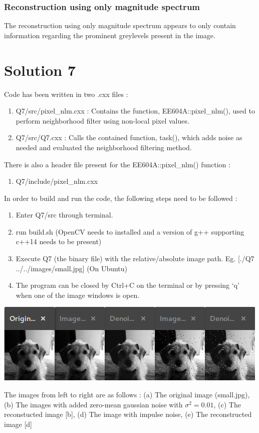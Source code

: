 \documentclass[a4paper,fleqn,11pt]{article}
\theoremstyle{mytheor}
\begin{document}
\subsubsection*{Reconstruction using only magnitude spectrum}
The reconstruction using only magnitude spectrum appears to only contain information regarding the prominent greylevels present in the image.

\section*{Solution 7}
Code has been written in two .cxx files :
\begin{enumerate}
\item Q7/src/pixel\_nlm.cxx : Contains the function, EE604A::pixel\_nlm(), used to perform neighborhood filter using non-local pixel values.
\item Q7/src/Q7.cxx : Calls the contained function, task(), which adds noise as needed and evaluated the neighborhood filtering method.
\end{enumerate}

There is also a header file present for the EE604A::pixel\_nlm() function :
\begin{enumerate}
\item Q7/include/pixel\_nlm.cxx
\end{enumerate}

In order to build and run the code, the following steps need to be followed :
\begin{enumerate}
\item Enter Q7/src through terminal.
\item run build.sh (OpenCV needs to installed and a version of g++ supporting c++14 needs to be present)
\item Execute Q7 (the binary file) with the relative/absolute image path. Eg. [./Q7 ../../images/small.jpg] (On Ubuntu)
\item The program can be closed by Ctrl+C on the terminal or by pressing `q' when one of the image windows is open.
\end{enumerate}
\begin{center}
\includegraphics[scale=1.0]{../results/Q7_sigma01.png}
\end{center}
The images from left to right are as follows : (a) The original image (small.jpg), (b) The images with added zero-mean gaussian noise with $\sigma^2 = 0.01$, (c) The reconstucted image [b], (d) The image with impulse noise, (e) The reconstructed image [d]
\end{document}
